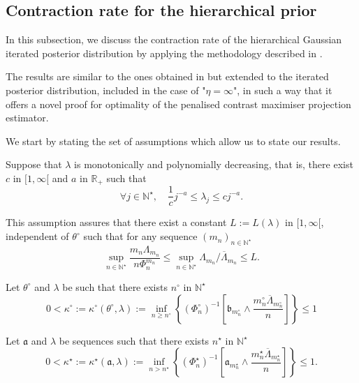 \subsection{Contraction rate for the hierarchical prior}\label{BAYES_GAUSS_CONTRACT_HIERARCHICAL}

In this subsection, we discuss the contraction rate of the hierarchical Gaussian iterated posterior distribution by applying the methodology described in .

The results are similar to the ones obtained in  but extended to the iterated posterior distribution, included in the case of "$\eta = \infty$", in such a way that it offers a novel proof for optimality of the penalised contrast maximiser projection estimator.

\medskip

We start by stating the set of assumptions which allow us to state our results.

\begin{as}\label{AS_BAYES_GAUSS_CONTRACT_HIERARCHICAL_LAMBDA}
Suppose that $\lambda$ is monotonically and polynomially decreasing, that is, there exist $c$ in $[1, \infty[$ and $a$ in $\mathds{R}_{+}$ such that
\[\forall j \in \mathds{N}^{\star}, \quad \frac{1}{c} j^{-a} \leq \lambda_{j} \leq c j^{-a}.\]
\end{as}

This assumption assures that there exist a constant $L := L(\lambda)$ in $[1, \infty[$, independent of $\theta^{\circ}$ such that for any sequence $\left(m_{n}\right)_{n \in \mathds{N}^{\star}}$ 
\[\sup\limits_{n \in \mathds{N}^{\star}} \frac{m_{n} \Lambda_{m_{n}}}{n \Phi_{n}^{m_{n}}} \leq \sup\limits_{n \in \mathds{N}^{\star}} \Lambda_{m_{n}}/\overline{\Lambda}_{m_{n}} \leq L.\]

\begin{as}\label{AS_BAYES_GAUSS_CONTRACT_HIERARCHICAL_ORACLE}
Let $\theta^{\circ}$ and $\lambda$ be such that there exists $n^{\circ}$ in $\mathds{N}^{\star}$
\[0 < \kappa^{\circ} := \kappa^{\circ}(\theta^{\circ}, \lambda) := \inf\limits_{n \geq n^{\circ}} \left\{\left(\Phi_{n}^{\circ}\right)^{-1} \left[\mathfrak{b}_{m_{n}^{\circ}} \wedge \frac{m_{n}^{\circ} \overline{\Lambda}_{m_{n}^{\circ}}}{n}\right]\right\} \leq 1\]
\end{as}

\begin{as}\label{AS_BAYES_GAUSS_CONTRACT_HIERARCHICAL_MINIMAX}
Let $\mathfrak{a}$ and $\lambda$ be sequences such that there exists $n^{\star}$ in $\mathds{N}^{\star}$
\[0 < \kappa^{\star} := \kappa^{\star}(\mathfrak{a}, \lambda) := \inf\limits_{n > n^{\star}} \left\{\left(\Phi_{n}^{\star}\right)^{-1}\left[\mathfrak{a}_{m_{n}^{\star}} \wedge \frac{m_{n}^{\star} \overline{\Lambda}_{m_{n}^{\star}}}{n}\right]\right\} \leq 1.\]
\end{as}

